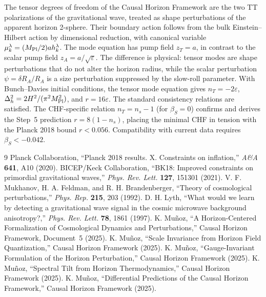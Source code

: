 \documentclass[12pt,a4paper]{article}
\begin{document}
The tensor degrees of freedom of the Causal Horizon Framework are the two TT polarizations of the gravitational wave, treated as shape perturbations of the apparent horizon 2-sphere. Their boundary action follows from the bulk Einstein--Hilbert action by dimensional reduction, with canonical variable $\mu_k^\lambda = (M_{\rm Pl}/2)a h_k^\lambda$. The mode equation has pump field $z_T = a$, in contrast to the scalar pump field $z_A = a/\sqrt\varepsilon$. The difference is physical: tensor modes are shape perturbations that do not alter the horizon radius, while the scalar perturbation $\psi = \delta R_A/R_A$ is a size perturbation suppressed by the slow-roll parameter. With Bunch--Davies initial conditions, the tensor mode equation gives $n_T = -2\varepsilon$, $\Delta_h^2 = 2H^2/(\pi^2 M_{\rm Pl}^2)$, and $r = 16\varepsilon$. The standard consistency relations are satisfied. The CHF-specific relation $n_T = n_s - 1$ (for $\beta_S = 0$) confirms and derives the Step~5 prediction $r = 8(1-n_s)$, placing the minimal CHF in tension with the Planck 2018 bound $r < 0.056$. Compatibility with current data requires $\beta_S < -0.042$.

\begin{thebibliography}{9}
 Planck Collaboration, ``Planck 2018 results. X. Constraints on inflation,'' \textit{A\&A} \textbf{641}, A10 (2020).
 BICEP/Keck Collaboration, ``BK18: Improved constraints on primordial gravitational waves,'' \textit{Phys. Rev. Lett.} \textbf{127}, 151301 (2021).
 V. F. Mukhanov, H. A. Feldman, and R. H. Brandenberger, ``Theory of cosmological perturbations,'' \textit{Phys. Rep.} \textbf{215}, 203 (1992).
 D. H. Lyth, ``What would we learn by detecting a gravitational wave signal in the cosmic microwave background anisotropy?,'' \textit{Phys. Rev. Lett.} \textbf{78}, 1861 (1997).
 K. Mu\~noz, ``A Horizon-Centered Formalization of Cosmological Dynamics and Perturbations,'' Causal Horizon Framework, Document~5 (2025).
 K. Mu\~noz, ``Scale Invariance from Horizon Field Quantization,'' Causal Horizon Framework (2025).
 K. Mu\~noz, ``Gauge-Invariant Formulation of the Horizon Perturbation,'' Causal Horizon Framework (2025).
 K. Mu\~noz, ``Spectral Tilt from Horizon Thermodynamics,'' Causal Horizon Framework (2025).
 K. Mu\~noz, ``Differential Predictions of the Causal Horizon Framework,'' Causal Horizon Framework (2025).
\end{thebibliography}
\end{document}
